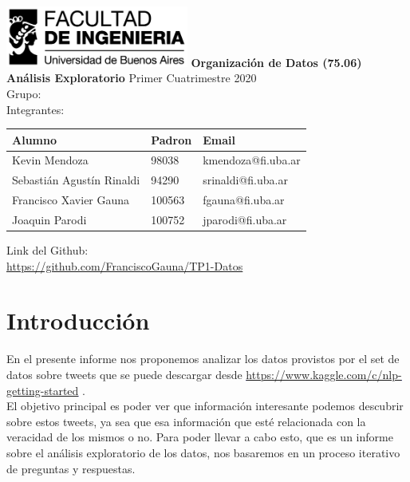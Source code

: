\documentclass[titlepage,a4paper]{article}
\begin{document}
\begin{titlepage} %
	\hfill\includegraphics[width=6cm]{logofiuba.jpg}
    \centering
    \vfill
    \Huge \textbf{Organización de Datos (75.06)}
    \vskip1cm
    \Huge \textbf{Análisis Exploratorio}
    \vskip2cm
    \Large Primer Cuatrimestre 2020\\
    Grupo: \\
    Integrantes:\\
    \vfill
    \begin{tabular}{ | l | l | l | } 
      \hline
      Alumno & Padron & Email \\ \hline
      Kevin Mendoza & 98038 & kmendoza@fi.uba.ar \\ \hline
      Sebastián Agustín Rinaldi & 94290 & srinaldi@fi.uba.ar \\ \hline
      Francisco Xavier Gauna & 100563 & fgauna@fi.uba.ar \\ \hline
      Joaquin Parodi & 100752 & jparodi@fi.uba.ar \\ \hline
  	\end{tabular}
    \vfill
    \vfill
    Link del Github:\\\textcolor{black}{\underline{\url{https://github.com/FranciscoGauna/TP1-Datos}}}
\end{titlepage}
\tableofcontents %
\newpage


\section{\Large Introducción}
{\Large 
En el presente informe nos proponemos analizar los datos provistos por el set de datos sobre tweets que se puede descargar desde \textcolor{blue}{\underline{\url{https://www.kaggle.com/c/nlp-getting-started}}} .\\
El objetivo principal es poder ver que información interesante podemos descubrir sobre estos tweets, ya sea que esa información que esté relacionada con la veracidad de los mismos o no. Para poder llevar a cabo esto, que es un informe sobre el análisis exploratorio de los datos, nos basaremos en un proceso iterativo de preguntas y respuestas.
\par}
\end{document}
